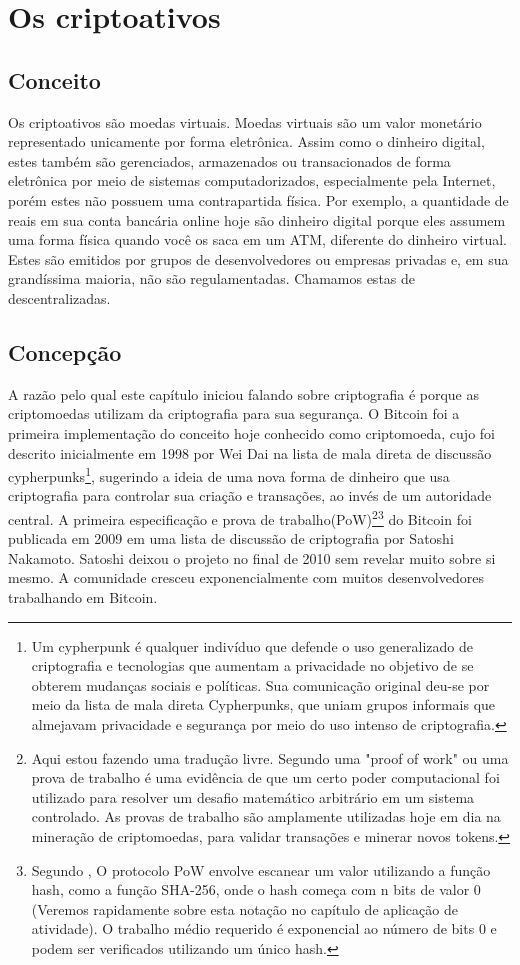 \section{Os criptoativos}

\subsection{Conceito}
Os criptoativos são moedas virtuais. Moedas virtuais são um valor monetário representado unicamente por forma eletrônica. Assim como o dinheiro digital, estes também são gerenciados, armazenados ou transacionados de forma eletrônica por meio de sistemas computadorizados, especialmente pela Internet, porém estes não possuem uma contrapartida física. Por exemplo, a quantidade de reais em sua conta bancária online hoje são dinheiro digital porque eles assumem uma forma física quando você os saca em um ATM, diferente do dinheiro virtual. Estes são emitidos por grupos de desenvolvedores ou empresas privadas e, em sua grandíssima maioria, não são regulamentadas. Chamamos estas de descentralizadas.	
 
 \subsection{Concepção}
  A razão pelo qual este capítulo iniciou falando sobre criptografia é porque as criptomoedas utilizam da criptografia para sua segurança.
 O Bitcoin foi a primeira implementação do conceito hoje conhecido como criptomoeda, cujo foi descrito inicialmente em 1998 por Wei Dai na lista de mala direta de discussão cypherpunks\footnote{Um cypherpunk é qualquer indivíduo que defende o uso generalizado de criptografia  e tecnologias que aumentam a privacidade no objetivo de se obterem mudanças sociais e políticas. Sua comunicação original deu-se por meio da lista de mala direta Cypherpunks, que uniam grupos informais que almejavam privacidade e segurança por meio do uso intenso de criptografia.}, sugerindo a ideia de uma nova forma de dinheiro que usa criptografia para controlar sua criação e transações, ao invés de um autoridade central. A primeira especificação e prova de  trabalho(PoW)\footnote{Aqui estou fazendo uma tradução livre. Segundo \cite{INVPD1} uma "proof of work" ou uma prova de trabalho é uma evidência de que um certo poder computacional foi utilizado para resolver um desafio matemático arbitrário em um sistema controlado. As provas de trabalho são amplamente utilizadas hoje em dia na mineração de criptomoedas, para validar transações e minerar novos tokens.}\footnote{Segundo \cite{NAKAMOTO} , O protocolo PoW envolve escanear um valor utilizando a função hash, como a função SHA-256, onde o hash começa com n bits de valor 0 (Veremos rapidamente sobre esta notação no capítulo de aplicação de atividade). O trabalho médio requerido é exponencial ao número de bits 0 e podem ser verificados utilizando um único hash.} do Bitcoin foi publicada em 2009 em uma lista de discussão de criptografia por Satoshi Nakamoto. Satoshi deixou o projeto no final de 2010 sem revelar muito sobre si mesmo. A comunidade cresceu exponencialmente com muitos desenvolvedores trabalhando em Bitcoin. \cite{BTCPROJ}

